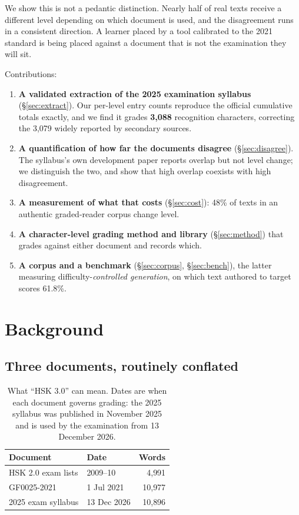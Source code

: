 \documentclass[11pt]{article}
\begin{document}
We show this is not a pedantic distinction. Nearly half of real texts receive a
different level depending on which document is used, and the disagreement runs
in a consistent direction. A learner placed by a tool calibrated to the 2021
standard is being placed against a document that is not the examination they
will sit.

\noindent Contributions:

\begin{enumerate}
\item \textbf{A validated extraction of the 2025 examination syllabus}
  (\S\ref{sec:extract}). Our per-level entry counts reproduce the official
  cumulative totals exactly, and we find it grades \textbf{3{,}088} recognition
  characters, correcting the 3{,}079 widely reported by secondary sources.
\item \textbf{A quantification of how far the documents disagree}
  (\S\ref{sec:disagree}). The syllabus's own development paper
  \citep{feng2026hsk30} reports overlap but not level change; we distinguish
  the two, and show that high overlap coexists with high disagreement.
\item \textbf{A measurement of what that costs} (\S\ref{sec:cost}): 48\% of
  texts in an authentic graded-reader corpus change level.
\item \textbf{A character-level grading method and library}
  (\S\ref{sec:method}) that grades against either document and records which.
\item \textbf{A corpus and a benchmark} (\S\ref{sec:corpus},
  \S\ref{sec:bench}), the latter measuring difficulty-\emph{controlled
  generation}, on which text authored to target scores 61.8\%.
\end{enumerate}

\section{Background}

\subsection{Three documents, routinely conflated}

\begin{table}[t]
\centering\small
\begin{tabular}{@{}llr@{}}
\toprule
\textbf{Document} & \textbf{Date} & \textbf{Words} \\
\midrule
HSK 2.0 exam lists & 2009--10 & 4{,}991 \\
GF0025-2021 & 1 Jul 2021 & 10{,}977 \\
2025 exam syllabus & 13 Dec 2026 & 10{,}896 \\
\bottomrule
\end{tabular}
\caption{What ``HSK 3.0'' can mean. Dates are when each document governs
grading: the 2025 syllabus was published in November 2025 and is used by the
examination from 13 December 2026.}
\label{tab:documents}
\end{table}
\end{document}
